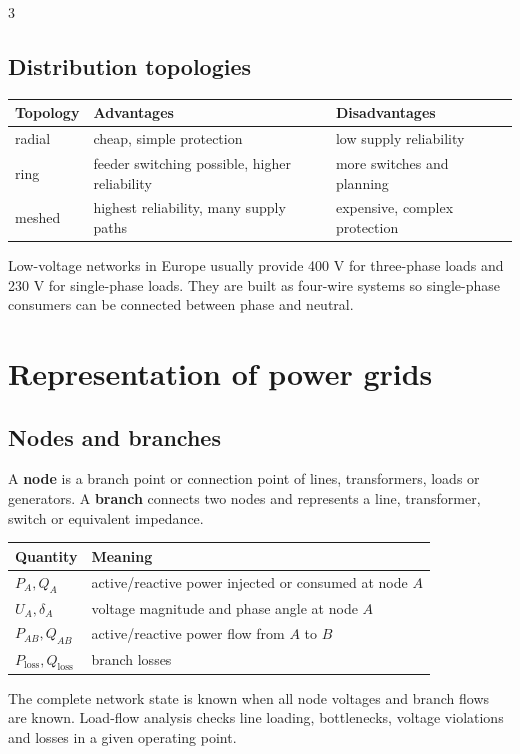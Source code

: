\documentclass[9pt, landscape, a4paper]{article}
\begin{document}
\begin{multicols*}{3}
\subsection{Distribution topologies}
\begin{tabularx}{\columnwidth}{@{}lXX@{}}
  \toprule
  \textbf{Topology} & \textbf{Advantages} & \textbf{Disadvantages}\\
  \midrule
  radial & cheap, simple protection & low supply reliability\\
  ring & feeder switching possible, higher reliability & more switches and planning\\
  meshed & highest reliability, many supply paths & expensive, complex protection\\
  \bottomrule
\end{tabularx}

Low-voltage networks in Europe usually provide 400 V for three-phase loads and
230 V for single-phase loads. They are built as four-wire systems so
single-phase consumers can be connected between phase and neutral.

\section{Representation of power grids}
\subsection{Nodes and branches}
A \textbf{node} is a branch point or connection point of lines, transformers,
loads or generators. A \textbf{branch} connects two nodes and represents a line,
transformer, switch or equivalent impedance.

\begin{tabularx}{\columnwidth}{@{}lX@{}}
  \toprule
  \textbf{Quantity} & \textbf{Meaning}\\
  \midrule
  $P_A,Q_A$ & active/reactive power injected or consumed at node $A$\\
  $U_A,\delta_A$ & voltage magnitude and phase angle at node $A$\\
  $P_{AB},Q_{AB}$ & active/reactive power flow from $A$ to $B$\\
  $P_{\mathrm{loss}},Q_{\mathrm{loss}}$ & branch losses\\
  \bottomrule
\end{tabularx}

The complete network state is known when all node voltages and branch flows are
known. Load-flow analysis checks line loading, bottlenecks, voltage violations
and losses in a given operating point.


\end{multicols*}
\end{document}
